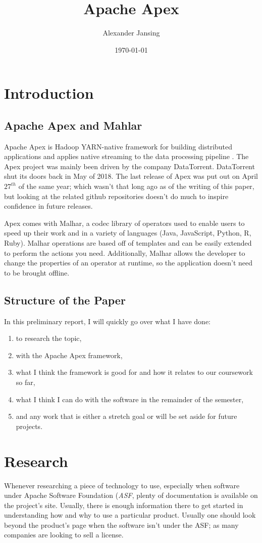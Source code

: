 \documentclass[11 pt]{IEEEtran}
\title{Apache Apex}
\author{Alexander Jansing}
\date{\today}
\begin{document}
\maketitle


\section{Introduction}
\subsection{Apache Apex and Mahlar}
Apache Apex is Hadoop YARN-native framework for building distributed applications and applies native streaming to the data processing pipeline \cite{WEISE}. The Apex project was mainly been driven by the company DataTorrent. DataTorrent shut its doors back in May of 2018\cite{WIKI}\cite{DATANAMI}. The last release of Apex was put out on April $27^{th}$ of the same year; which wasn't that long ago as of the writing of this paper, but looking at the related github repositories doesn't do much to inspire confidence in future releases.

Apex comes with Malhar, a codec library of operators used to enable users to speed up their work and in a variety of languages (Java, JavaScript, Python, R, Ruby). Malhar operations are based off of templates and can be easily extended to perform the actions you need. Additionally, Malhar allows the developer to change the properties of an operator at runtime, so the application doesn't need to be brought offline\cite{MALHAR}.

\subsection{Structure of the Paper}
In this preliminary report, I will quickly go over what I have done:
\begin{enumerate}
\item to research the topic,
\item with the Apache Apex framework,
\item what I think the framework is good for and how it relates to our coursework so far,
\item what I think I can do with the software in the remainder of the semester,
\item and any work that is either a stretch goal or will be set aside for future projects.
\end{enumerate}
 

\section{Research}
Whenever researching a piece of technology to use, especially when software under Apache Software Foundation (\emph{ASF}, plenty of documentation is available on the project's site. Usually, there is enough information there to get started in understanding how and why to use a particular product. Usually one should look beyond the product's page when the software isn't under the ASF; as many companies are looking to sell a license.
\end{document}
